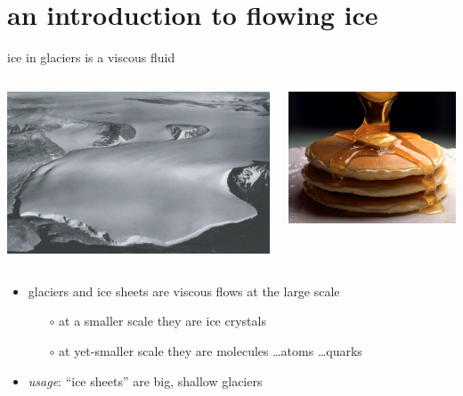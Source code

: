 \documentclass[hide notes,intlimits]{beamer}
\begin{document}
\section[intro to ice flow]{an introduction to flowing ice}


\begin{frame}{ice in glaciers is a viscous fluid}
\begin{columns}
\begin{column}{0.65\textwidth}
\includegraphics[width=1.0\textwidth]{polaris}
\end{column}
\begin{column}{0.35\textwidth}
\includegraphics[width=1.0\textwidth]{pancakes}
\end{column}
\end{columns}

\bigskip
\begin{itemize}
\item glaciers and ice sheets are viscous flows at the large scale
  \begin{itemize}
  \item[$\circ$] at a smaller scale they are ice crystals
  \item[$\circ$] at yet-smaller scale they are molecules \dots atoms \dots quarks
  \end{itemize}
\item \emph{usage}: ``ice sheets'' are big, shallow glaciers
\end{itemize}
\end{frame}
\end{document}
